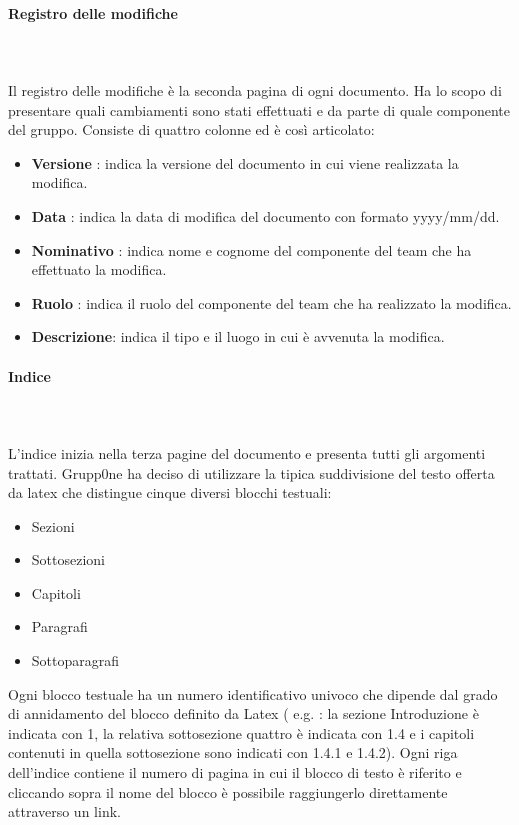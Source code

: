 \documentclass[../norme-di-progetto.tex]{subfiles}
\begin{document}
\paragraph{Registro delle modifiche}\mbox{}\\
\label{par:registro delle modifiche}
\\Il registro delle modifiche è la seconda pagina di ogni documento. Ha lo scopo di presentare quali cambiamenti sono stati effettuati e da parte di quale componente del gruppo. Consiste di quattro colonne ed è così articolato:
\begin{itemize}
	\item \textbf{Versione} : indica la versione del documento in cui viene realizzata la modifica.
	\item \textbf{Data} : indica la data di modifica del documento con formato yyyy/mm/dd.
	\item \textbf{Nominativo} : indica nome e cognome del componente del team che ha effettuato la modifica.
	\item \textbf{Ruolo} : indica il ruolo del componente del team che ha realizzato la modifica.
	\item \textbf{Descrizione}: indica il tipo e il luogo in cui è avvenuta la modifica.
\end{itemize}
\paragraph{Indice}\mbox{}\\
\label{par:indice}
\\L'indice inizia nella terza pagine del documento e presenta tutti gli argomenti trattati. Grupp0ne ha deciso di utilizzare la tipica suddivisione del testo offerta da latex che distingue cinque diversi blocchi testuali:
\begin{itemize}
	\item Sezioni
	\item Sottosezioni
	\item Capitoli
	\item Paragrafi
	\item Sottoparagrafi 
\end{itemize}
Ogni blocco testuale ha un numero identificativo univoco che dipende dal grado di annidamento del blocco definito da Latex ( e.g. : la sezione Introduzione è indicata con 1, la relativa sottosezione quattro è indicata con 1.4 e i capitoli contenuti in quella sottosezione sono indicati con 1.4.1 e 1.4.2).
\newline Ogni riga dell'indice contiene il numero di pagina in cui il blocco di testo è riferito e cliccando sopra il nome del blocco è possibile raggiungerlo direttamente attraverso un link.
\end{document}
